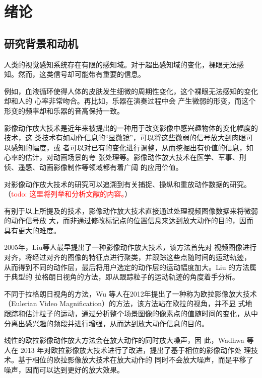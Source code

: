 \chapter{绪论}

\section{研究背景和动机}

人类的视觉感知系统存在有限的感知域。对于超出感知域的变化，裸眼无法感
知。然而，这类信号却可能带有重要的信息。

例如，血液循环使得人体的皮肤发生细微的周期性变化，这个裸眼无法感知的变化却和人的
心率非常吻合。再比如，乐器在演奏过程中会
产生微弱的形变，而这个形变的频率却和乐器的音高保持一致。

影像动作放大技术是近年来被提出的一种用于改变影像中感兴趣物体的变化幅度的技术，这
类技术有如动作信息的“显微镜”，可以将这些微弱的信号放大到肉眼可以感知的幅度，或
者可以对已有的变化进行调整，从而挖掘出有价值的信息，如心率的估计，对动画场景的夸
张处理等。影像动作放大技术在医学、军事、刑侦、遥感、动画影像制作等领域都有着广阔
的应用价值。

对影像动作放大技术的研究可以追溯到有关捕捉、操纵和重放动作数据的研究。（\textcolor{red}{todo: 这里将列举和分析文献\cite{wang1994representing,Unuma1995,Gleicher1998,Lee2002,Brand2000,Pullen2002,Li2002,Jojic2001,brostow1999motion}的内容。}）

有别于以上所提及的技术，影像动作放大技术直接通过处理视频图像数据来将微弱的动作信号放
大，而非通过修改标记点的位置信息来达到放大动作的目的，因而具有更大的难度。

2005年，Liu等人最早提出了一种影像动作放大技术，该方法首先对
视频图像进行对齐，将经过对齐的图像的特征点进行聚类，并跟踪这些点随时间的运动轨迹，
从而得到不同的动作层，最后将用户选定的动作层的运动幅度加大。Liu 的方法属于典型的
拉格朗日视角的方法，即从跟踪粒子的运动轨迹的角度着手分析。

不同于拉格朗日视角的方法，Wu 等人在2012年提出了一种称为欧拉影像放大技术（Eulerian
Video Magnification）的方法，该方法站在欧拉的视角，并不显
式地跟踪和估计粒子的运动，通过分析整个场景图像的像素点的值随时间的变化，从中
分离出感兴趣的频段并进行增强，从而达到放大动作信息的目的。

线性的欧拉影像动作放大方法会在放大动作的同时放大噪声，因
此，Wadhwa 等人在 2013 年对欧拉影像放大技术进行了改进，提出了基于相位的影像动作处
理技术。基于相位的欧拉影像放大技术在放大动作的
同时不会放大噪声，而是平移了噪声，因而可以达到更好的放大效果。

